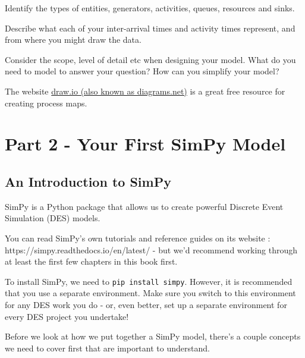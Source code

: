 \documentclass[
  letterpaper,
  DIV=11,
  numbers=noendperiod]{scrreprt}
\begin{document}
Identify the types of entities, generators, activities, queues,
resources and sinks.

Describe what each of your inter-arrival times and activity times
represent, and from where you might draw the data.

Consider the scope, level of detail etc when designing your model. What
do you need to model to answer your question? How can you simplify your
model?

\begin{tcolorbox}[enhanced jigsaw, colframe=quarto-callout-tip-color-frame, bottomtitle=1mm, breakable, rightrule=.15mm, coltitle=black, colbacktitle=quarto-callout-tip-color!10!white, opacityback=0, leftrule=.75mm, arc=.35mm, toptitle=1mm, title=\textcolor{quarto-callout-tip-color}{\faLightbulb}\hspace{0.5em}{Tip}, titlerule=0mm, colback=white, toprule=.15mm, bottomrule=.15mm, left=2mm, opacitybacktitle=0.6]

The website \href{https://app.diagrams.net/}{draw.io (also known as
diagrams.net)} is a great free resource for creating process maps.

\end{tcolorbox}

\part{Part 2 - Your First SimPy Model}

\chapter{An Introduction to SimPy}\label{an-introduction-to-simpy}

SimPy is a Python package that allows us to create powerful Discrete
Event Simulation (DES) models.

You can read SimPy's own tutorials and reference guides on its website :
https://simpy.readthedocs.io/en/latest/ - but we'd recommend working
through at least the first few chapters in this book first.

To install SimPy, we need to \texttt{pip\ install\ simpy}. However, it
is recommended that you use a separate environment. Make sure you switch
to this environment for any DES work you do - or, even better, set up a
separate environment for every DES project you undertake!

Before we look at how we put together a SimPy model, there's a couple
concepts we need to cover first that are important to understand.
\end{document}
